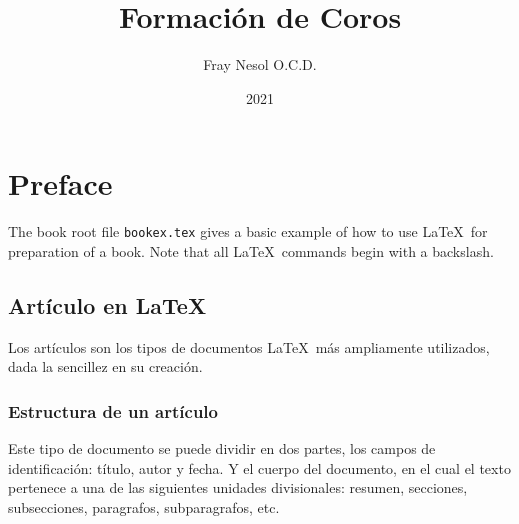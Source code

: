 \documentclass[letterpaper, 12pt]{book}
\title{\Huge{\textbf{Formaci\'on de Coros}}}
\author{\Large{Fray Nesol O.C.D.}}
\date{\large{2021}}
\begin{document}
    \maketitle
    \tableofcontents
    
    \chapter*{Preface}\normalsize
    The book root file {\tt bookex.tex} gives a basic example of how to use \LaTeX \ for preparation of a book. Note that all \LaTeX \ commands begin with a backslash.
    
    \section{Art\'iculo en \LaTeX}
    Los art\'iculos son los tipos de documentos \LaTeX\ m\'as ampliamente utilizados, dada la sencillez en su creaci\'on.

    \subsection{Estructura de un art\'iculo}
    Este tipo de documento se puede dividir en dos partes, los campos de identificaci\'on: t\'itulo, autor y fecha. Y el cuerpo del documento, en el cual el texto pertenece a una de las siguientes unidades divisionales: resumen, secciones, subsecciones, paragrafos, subparagrafos, etc.
\end{document}
